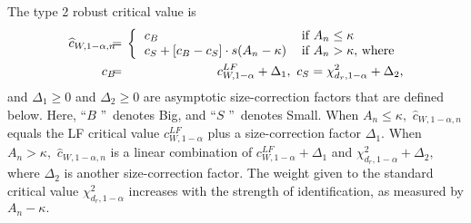 \documentclass[12pt,thmsb,titlepage,final,oneside,letterpaper]{article}
\begin{document}
The type 2 robust critical value is%
\begin{eqnarray}
\widehat{c}_{W,1-\alpha ,n}\hspace{-0.08in} &=&\hspace{-0.08in}\left\{ 
\begin{tabular}{ll}
$c_{B}$ & $\text{if }A_{n}\leq \kappa $ \\ 
$c_{S}+[c_{B}-c_{S}]\cdot s(A_{n}-\kappa )$ & $\text{if }A_{n}>\kappa ,$
where%
\end{tabular}%
\right.  \notag \\
c_{B}\hspace{-0.08in} &=&\hspace{-0.08in}c_{W,1-\alpha }^{LF}+\Delta _{1},%
\text{ }c_{S}=\chi _{d_{r},1-\alpha }^{2}+\Delta _{2},
\label{type 2 robust cv}
\end{eqnarray}%
and $\Delta _{1}\geq 0$ and $\Delta _{2}\geq 0$ are asymptotic
size-correction factors that are defined below. Here, \textquotedblleft $B$%
\textquotedblright\ denotes Big, and \textquotedblleft $S$%
\textquotedblright\ denotes Small. When $A_{n}\leq \kappa ,$ $\widehat{c}%
_{W,1-\alpha ,n}$ equals the LF critical value $c_{W,1-\alpha }^{LF}$ plus a
size-correction factor $\Delta _{1}.$ When $A_{n}>\kappa ,$ $\widehat{c}%
_{W,1-\alpha ,n}$ is a linear combination of $c_{W,1-\alpha }^{LF}+\Delta
_{1}$ and $\chi _{d_{r},1-\alpha }^{2}+\Delta _{2},$ where $\Delta _{2}$ is
another size-correction factor. The weight given to the standard critical
value $\chi _{d_{r},1-\alpha }^{2}$ increases with the strength of
identification, as measured by $A_{n}-\kappa .$
\end{document}
